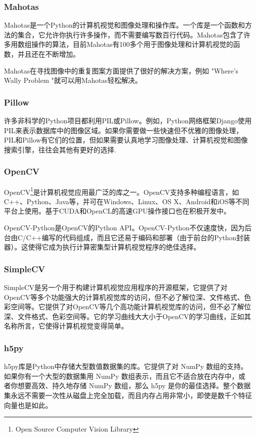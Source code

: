 \documentclass[scheme=chinese,a4paper]{article}
\begin{document}
\subsubsection{Mahotas}
Mahotas是一个Python的计算机视觉和图像处理和操作库。一个库是一个函数和方法的集合，它允许你执行许多操作，而不需要编写数百行代码。Mahotas包含了许多用数组操作的算法，目前Mahotas有100多个用于图像处理和计算机视觉的函数，并且还在不断增加。

Mahotas在寻找图像中的重复图案方面提供了很好的解决方案，例如 "Where's Wally Problem "就可以用Mahotas轻松解决。
\subsubsection{Pillow}
许多非科学的Python项目都利用PIL或Pillow。例如，Python网络框架Django使用PIL来表示数据库中的图像区域。如果你需要做一些快速但不优雅的图像处理，PIL和Pillow有它们的位置，但如果需要认真地学习图像处理、计算机视觉和图像搜索引擎，往往会其他有更好的选择.
\subsubsection{OpenCV}
OpenCV\footnote{Open Source Computer Vision Library}是计算机视觉应用最广泛的库之一。OpenCV支持多种编程语言，如C++、Python、Java等，并可在Windows、Linux、OS X、Android和iOS等不同平台上使用。基于CUDA和OpenCL的高速GPU操作接口也在积极开发中。

OpenCV-Python是OpenCV的Python API。OpenCV-Python不仅速度快，因为后台由C/C++编写的代码组成，而且它还易于编码和部署（由于前台的Python封装器）。这使得它成为执行计算密集型计算机视觉程序的绝佳选择。


\subsubsection{SimpleCV}
SimpleCV是另一个用于构建计算机视觉应用程序的开源框架，它提供了对OpenCV等多个功能强大的计算机视觉库的访问，但不必了解位深、文件格式、色彩空间等。它提供了对OpenCV等几个高功能计算机视觉库的访问，但不必了解位深、文件格式、色彩空间等。它的学习曲线大大小于OpenCV的学习曲线，正如其名称所言，它使得计算机视觉变得简单。
\subsubsection{h5py}
h5py库是Python中存储大型数值数据集的库。它提供了对 NumPy 数组的支持。如果你有一个大型的数据集用 NumPy 数组表示，而且它不适合放在内存中，或者你想要高效、持久地存储 NumPy 数组，那么 h5py 是你的最佳选择。整个数据集永远不需要一次性从磁盘上完全加载，而且内存占用非常小，即使是数千个特征向量也是如此。
\end{document}
